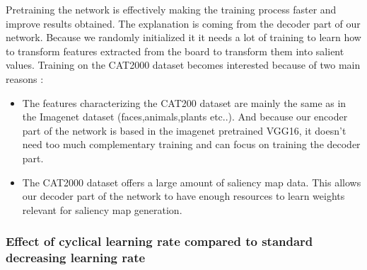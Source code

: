 Pretraining the network is effectively making the training process faster and improve results obtained. The explanation is coming from the decoder part of our network. Because we randomly initialized it it needs a lot of training to learn how to transform features extracted from the board to transform them into salient values. 
Training on the CAT2000 dataset becomes interested because of two main reasons : 
\begin{itemize}
    \item The features characterizing the CAT200 dataset are mainly the same as in the Imagenet dataset (faces,animals,plants etc..). And because our encoder part of the network is based in the imagenet pretrained VGG16, it doesn't need too much complementary training and can focus on training the decoder part. 
    \item The CAT2000 dataset offers a large amount of saliency map data. This allows our decoder part of the network to have enough resources to learn weights relevant for saliency map generation. 
\end{itemize}


\subsubsection{Effect of cyclical learning rate compared to standard decreasing learning rate}\label{section:strategies}

